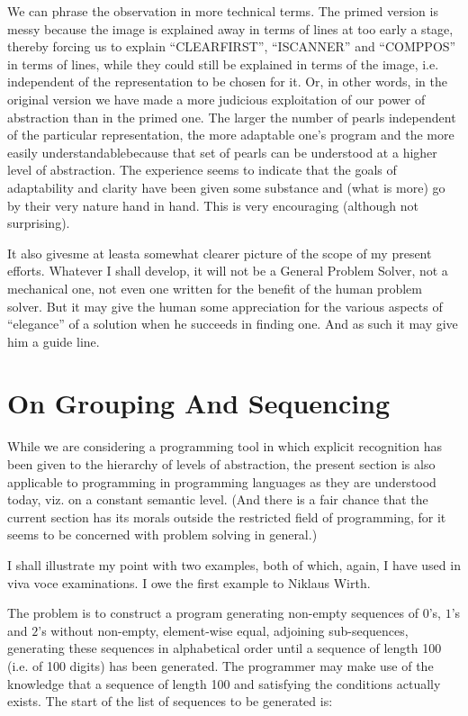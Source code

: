 \documentclass[twoside,11pt]{book}
\begin{document}
We can phrase the observation in more technical terms. The primed version is messy because the image is explained away in terms of lines at too early a stage, thereby forcing us to explain ``CLEARFIRST'', ``ISCANNER'' and ``COMPPOS'' in terms of lines, while they could still be explained in terms of the image, i.e. independent of the representation to be chosen for it. Or, in other words, in the original version we have made a more judicious exploitation of our power of abstraction than in the primed one. The larger the number of pearls independent of the particular representation, the more adaptable one's program and the more easily understandable\textemdash{}because that set of pearls can be understood at a higher level of abstraction. The experience seems to indicate that the goals of adaptability and clarity have been given some substance and (what is more) go by their very nature hand in hand. This is very encouraging (although not surprising).

It also gives\textemdash{}me at least\textemdash{}a somewhat clearer picture of the scope of my present efforts. Whatever I shall develop, it will not be a General Problem Solver, not a mechanical one, not even one written for the benefit of the human problem solver. But it may give the human some appreciation for the various aspects of ``elegance'' of a solution when he succeeds in finding one. And as such it may give him a guide line.

\section[On grouping and sequencing]{On Grouping And Sequencing}
\label{sec:grouping-and-sequencing}

While we are considering a programming tool in which explicit recognition has been given to the hierarchy of levels of abstraction, the present section is also applicable to programming in programming languages as they are understood today, viz. on a constant semantic level. (And there is a fair chance that the current section has its morals outside the restricted field of programming, for it seems to be concerned with problem solving in general.)

I shall illustrate my point with two examples, both of which, again, I have used in viva voce examinations. I owe the first example to Niklaus Wirth.

The problem is to construct a program generating non-empty sequences of $0$'s, $1$'s and $2$'s without non-empty, element-wise equal, adjoining sub-sequences, generating these sequences in alphabetical order until a sequence of length 100 (i.e. of 100 digits) has been generated. The programmer may make use of the knowledge that a sequence of length 100 and satisfying the conditions actually exists. The start of the list of sequences to be generated is:
\end{document}
